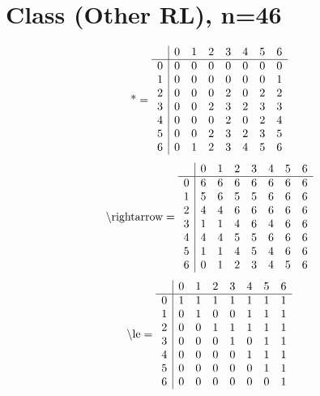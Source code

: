 \documentclass[11pt]{article}
\begin{document}
\section{Class (Other RL), n=46}
\[\text{*} = 
\begin{array}{r | r r r r r r r}
 & 0 & 1 & 2 & 3 & 4 & 5 & 6 \\ \hline
0 & 0 & 0 & 0 & 0 & 0 & 0 & 0 \\
1 & 0 & 0 & 0 & 0 & 0 & 0 & 1 \\
2 & 0 & 0 & 0 & 2 & 0 & 2 & 2 \\
3 & 0 & 0 & 2 & 3 & 2 & 3 & 3 \\
4 & 0 & 0 & 0 & 2 & 0 & 2 & 4 \\
5 & 0 & 0 & 2 & 3 & 2 & 3 & 5 \\
6 & 0 & 1 & 2 & 3 & 4 & 5 & 6 \\
\end{array}
\]
\[\text{\textbackslash rightarrow} = 
\begin{array}{r | r r r r r r r}
 & 0 & 1 & 2 & 3 & 4 & 5 & 6 \\ \hline
0 & 6 & 6 & 6 & 6 & 6 & 6 & 6 \\
1 & 5 & 6 & 5 & 5 & 6 & 6 & 6 \\
2 & 4 & 4 & 6 & 6 & 6 & 6 & 6 \\
3 & 1 & 1 & 4 & 6 & 4 & 6 & 6 \\
4 & 4 & 4 & 5 & 5 & 6 & 6 & 6 \\
5 & 1 & 1 & 4 & 5 & 4 & 6 & 6 \\
6 & 0 & 1 & 2 & 3 & 4 & 5 & 6 \\
\end{array}
\]
\[\text{\textbackslash le} = 
\begin{array}{r | r r r r r r r}
 & 0 & 1 & 2 & 3 & 4 & 5 & 6 \\ \hline
0 & 1 & 1 & 1 & 1 & 1 & 1 & 1 \\
1 & 0 & 1 & 0 & 0 & 1 & 1 & 1 \\
2 & 0 & 0 & 1 & 1 & 1 & 1 & 1 \\
3 & 0 & 0 & 0 & 1 & 0 & 1 & 1 \\
4 & 0 & 0 & 0 & 0 & 1 & 1 & 1 \\
5 & 0 & 0 & 0 & 0 & 0 & 1 & 1 \\
6 & 0 & 0 & 0 & 0 & 0 & 0 & 1 \\
\end{array}
\]
\end{document}
